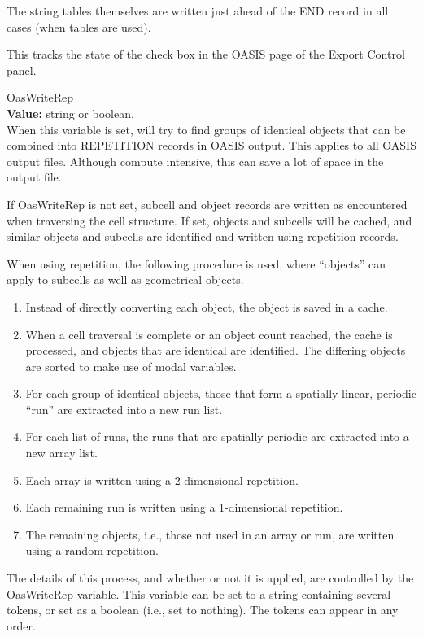 \begin{description}
The string tables themselves are written just ahead of the END
record in all cases (when tables are used).

This tracks the state of the check box in the {\cb OASIS} page of the
{\cb Export Control} panel.

\label{OasWriteRep}
\item{\et OasWriteRep}\\
{\bf Value:} string or boolean.\\
When this variable is set, {\Xic} will try to find groups of identical
objects that can be combined into REPETITION records in OASIS output. 
This applies to all OASIS output files.  Although compute intensive,
this can save a lot of space in the output file.

If {\et OasWriteRep} is not set, subcell and object records are
written as encountered when traversing the cell structure.  If set,
objects and subcells will be cached, and similar objects and subcells
are identified and written using repetition records.

When using repetition, the following procedure is used, where
``objects'' can apply to subcells as well as geometrical objects.

\begin{enumerate}
\item{Instead of directly converting each object, the object is
   saved in a cache.}
\item{When a cell traversal is complete or an object count reached,
   the cache is processed, and objects that are identical are
   identified.  The differing objects are sorted to make use of modal
   variables.}
\item{For each group of identical objects, those that form a
   spatially linear, periodic ``run'' are extracted into a new run
   list.}
\item{For each list of runs, the runs that are spatially periodic
   are extracted into a new array list.}
\item{Each array is written using a 2-dimensional repetition.}
\item{Each remaining run is written using a 1-dimensional
   repetition.}
\item{The remaining objects, i.e., those not used in an array or
   run, are written using a random repetition.}
\end{enumerate}

The details of this process, and whether or not it is applied, are
controlled by the {\et OasWriteRep} variable.  This variable can be
set to a string containing several tokens, or set as a boolean (i.e.,
set to nothing).  The tokens can appear in any order.


\end{description}
